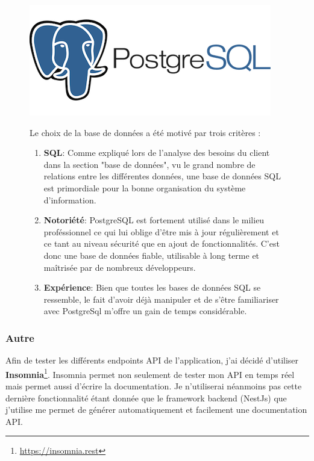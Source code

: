 \begin{figure}[H]
  \begin{minipage}{.3\textwidth}
    \includegraphics[width=0.75\linewidth]{img/tech/PostgreSql.png} 
  \end{minipage} 
  \begin{minipage}{.7\textwidth}
    Le choix de la base de données a été motivé par trois critères :
    \begin{enumerate}
      \item \textbf{SQL}: Comme expliqué lors de l'analyse des besoins du client dans la section "base de données", vu le grand nombre de relations entre les différentes données, une base de données SQL est primordiale pour la bonne organisation du système d'information.
      \item \textbf{Notoriété}: PostgreSQL est fortement utilisé dans le milieu proféssionnel ce qui lui oblige d'être mis à jour régulièrement et ce tant au niveau sécurité que en ajout de fonctionnalités. C'est donc une base de données fiable, utilisable à long terme et maîtrisée par de nombreux développeurs.
      \item \textbf{Expérience}: Bien que toutes les bases de données SQL se ressemble, le fait d'avoir déjà manipuler et de s'être familiariser avec PostgreSql m'offre un gain de temps considérable.
    \end{enumerate}
  \end{minipage} 
\end{figure}

\subsubsection{Autre}


Afin de tester les différents endpoints API de l'application, j'ai décidé d'utiliser \textbf{Insomnia}\footnote{\url{https://insomnia.rest}}. Insomnia permet non seulement de tester mon API en temps réel mais permet aussi d'écrire la documentation. Je n'utiliserai néanmoins pas cette dernière fonctionnalité étant donnée que le framework backend (NestJs) que j'utilise me permet de générer automatiquement et facilement une documentation API.

